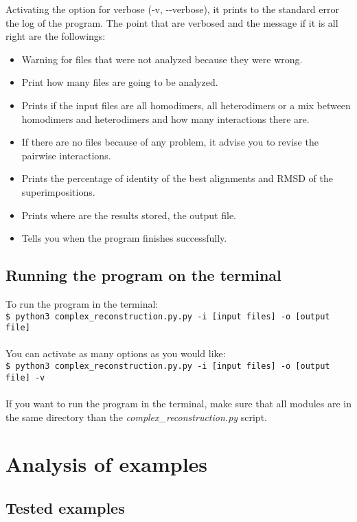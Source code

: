 \documentclass[a4paper,10pt]{report}
\begin{document}
Activating the option for verbose (-v, -{}-verbose), it prints to the standard error the log of the program. The point that are verbosed and the message if it is all right are the followings:

\begin{itemize}
 \item Warning for files that were not analyzed because they were wrong.
 \item Print how many files are going to be analyzed.
 \item Prints if the input files are all homodimers, all heterodimers or a mix between homodimers and heterodimers and how many interactions there are.
 \item If there are no files because of any problem, it advise you to revise the pairwise interactions.
 \item Prints the percentage of identity of the best alignments and RMSD of the superimpositions.
 \item Prints where are the results stored, the output file.
 \item Tells you when the program finishes successfully.
\end{itemize}

\section{Running the program on the terminal}

To run the program in the terminal:\\ \texttt{\$ python3 complex_reconstruction.py.py -i [input files] -o [output file]} \\\\ You can activate as many options as you would like:\\ \texttt{\$ python3 complex_reconstruction.py.py -i [input files] -o [output file] -v }\\\\
If you want to run the program in the terminal, make sure that all modules are in the same directory than the \textit{complex_reconstruction.py} script.



\chapter{Analysis of examples}

\section{Tested examples}
\end{document}

